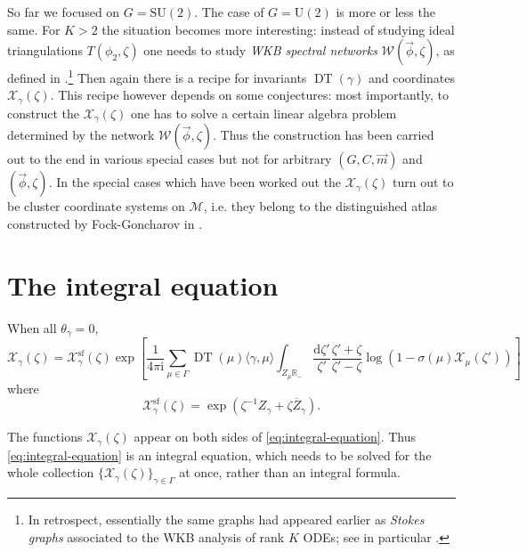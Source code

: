 \documentclass[12pt,letterpaper,reqno]{article}
\numberwithin{equation}{section}
\newcommand{\cM}{\ensuremath{\mathcal M}}
\newcommand{\cX}{\ensuremath{\mathcal X}}
\newcommand{\cW}{\ensuremath{\mathcal W}}
\newcommand{\R}{\ensuremath{\mathbb R}}
\newcommand{\I}{{\mathrm i}}
\newcommand{\de}{\mathrm{d}}
\renewcommand{\sf}{\mathrm{sf}}
\newcommand{\IP}[1]{\langle#1\rangle}
\newcommand{\vphi}{{\vec\phi}}
\newcommand{\ti}[1]{\textit{#1}}
\DeclareMathOperator{\DT}{DT}
\newcommand{\SU}{\mathrm{SU}}
\newcommand{\U}{\mathrm{U}}
\begin{document}
\begin{remark} \label{rem:higher-rank}
So far we focused on $G = \SU(2)$. The case of $G = \U(2)$ is more or
less the same. For $K>2$ the situation becomes more interesting:
instead of studying ideal triangulations $T(\phi_2, \zeta)$ 
one needs to study \ti{WKB spectral networks} $\cW(\vphi, \zeta)$, as defined in \cite{Gaiotto2012}.\footnote{In retrospect,
essentially the same graphs had appeared earlier as 
\ti{Stokes graphs} associated to the WKB analysis of
rank $K$ ODEs; see in particular \cite{berk:988}.}
Then again there is a recipe for invariants $\DT(\gamma)$
and coordinates $\cX_\gamma(\zeta)$. This recipe however 
depends on some conjectures:
most importantly, to construct the $\cX_\gamma(\zeta)$ 
one has to solve a certain linear algebra problem determined by the 
network $\cW(\vphi,\zeta)$.
Thus the construction has been carried out to the end in various special
cases but not for arbitrary $(G,C,\vec{m})$ and $(\vphi, \zeta)$. In the special cases which have been worked out
\cite{Gaiotto:2012db,Neitzke:2017yos} the $\cX_\gamma(\zeta)$
turn out to be cluster coordinate systems on $\cM$,
i.e. they belong to the distinguished atlas constructed
by Fock-Goncharov in \cite{MR2233852}.
\end{remark}

\section{The integral equation} \label{sec:integral-equations}

\begin{conj}[Integral equation for $\theta_\gamma = 0$] \label{conj:integral-equation}
When all $\theta_\gamma = 0$,
\begin{equation} \label{eq:integral-equation}
  \cX_\gamma(\zeta) = \cX_\gamma^\sf(\zeta) \exp \left[ \frac{1}{4\pi \I} \sum_{\mu \in \Gamma} \DT(\mu) \IP{\gamma,\mu} \int_{Z_\mu \R_-} \frac{\de \zeta'}{\zeta'} \frac{\zeta' + \zeta}{\zeta'-\zeta} \log(1 - \sigma(\mu) \cX_\mu(\zeta')) \right]
\end{equation}
where 
\begin{equation}
  \cX_\gamma^\sf(\zeta) = \exp \left( \zeta^{-1} Z_\gamma + \zeta \overline{Z}_\gamma \right).
\end{equation}
\end{conj}
The functions $\cX_\gamma(\zeta)$ appear on both sides of
\eqref{eq:integral-equation}. Thus \eqref{eq:integral-equation} is an integral equation, which needs to be solved for 
the whole collection $\{\cX_\gamma(\zeta)\}_{\gamma \in \Gamma}$
at once, rather than an integral formula.
\end{document}
